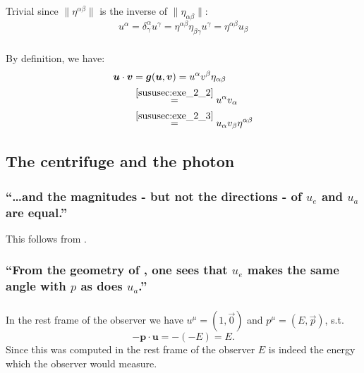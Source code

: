 \subsubsection{ }  \label{sususec:exe_2_3} 
Trivial since $\|\eta^{\alpha\beta}\|$ is the inverse of $\|\eta_{\alpha\beta}\|$:
\begin{equation*} 
	u^\alpha=\delta_\gamma^\alpha u^\gamma=\eta^{\alpha\beta}\eta_{\beta\gamma}u^\gamma=\eta^{\alpha\beta}u_\beta
\end{equation*}

\subsubsection{ }    \label{sususec:exe_2_4} 
 By definition, we have:
 \begin{align*} 
 	\boldsymbol{u}\cdot \boldsymbol{v}&=\boldsymbol{g}(\boldsymbol{u}, \boldsymbol{v})
 	=u^\alpha v^\beta \eta_{\alpha\beta}\\
 	&\overset{\ref{sususec:exe_2_2}}{=}u^\alpha v_\alpha\\
 	&\overset{\ref{sususec:exe_2_3}}{=}u_\alpha v_\beta \eta^{\alpha\beta}\\
 \end{align*}
\subsection{The centrifuge and the photon}\label{susec:2_8} 
\subsubsection{\enquote{\dots and the magnitudes - but not the directions - of $u_e$ and $u_a$ are equal.} }\label{sususec:2_8_p64_1}
This follows from .

\subsubsection{\enquote{From the geometry of , one sees that $u_e$ makes the same angle with $p$ as does $u_a$.} }\label{sususec:2_8_p64_2}
\todo

\subsubsection{ }    \label{sususec:exe_2_5} 
\paragraph{\phantom{,}}
In the rest frame of the observer we have $u^\mu=(1,\vec{0})$ and $p^\mu=(E,\vec{p})$, s.t.
\[-\boldsymbol{p}\cdot\boldsymbol{u}=-(-E)=E.\]
Since this was computed in the rest frame of the observer $E$ is indeed the energy which the observer would measure.

